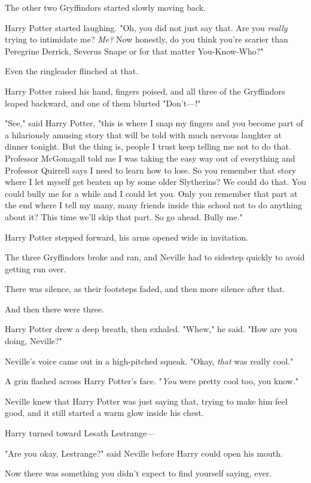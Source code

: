 The other two Gryffindors started slowly moving back.

Harry Potter started laughing. "Oh, you did not just say that. Are you
\emph{really} trying to intimidate me? \emph{Me?} Now honestly, do you think
you're scarier than Peregrine Derrick, Severus Snape or for that matter
You-Know-Who?"

Even the ringleader flinched at that.

Harry Potter raised his hand, fingers poised, and all three of the Gryffindors
leaped backward, and one of them blurted "Don't---!"

"See," said Harry Potter, "this is where I snap my fingers and you become part
of a hilariously amusing story that will be told with much nervous laughter at
dinner tonight. But the thing is, people I trust keep telling me not to do
that. Professor McGonagall told me I was taking the easy way out of everything
and Professor Quirrell says I need to learn how to lose. So you remember that
story where I let myself get beaten up by some older Slytherins? We could do
that. You could bully me for a while and I could let you. Only you remember
that part at the end where I tell my many, many friends inside this school not
to do anything about it? This time we'll skip that part. So go ahead. Bully me."

Harry Potter stepped forward, his arms opened wide in invitation.

The three Gryffindors broke and ran, and Neville had to sidestep quickly to
avoid getting run over.

There was silence, as their footsteps faded, and then more silence after that.

And then there were three.

Harry Potter drew a deep breath, then exhaled. "Whew," he said. "How are you
doing, Neville?"

Neville's voice came out in a high-pitched squeak. "Okay, \emph{that} was
really cool."

A grin flashed across Harry Potter's face. "\emph{You} were pretty cool too,
you know."

Neville knew that Harry Potter was just saying that, trying to make him feel
good, and it still started a warm glow inside his chest.

Harry turned toward Lesath Lestrange---

"Are you okay, Lestrange?" said Neville before Harry could open his mouth.

Now there was something you didn't expect to find yourself saying, ever.

